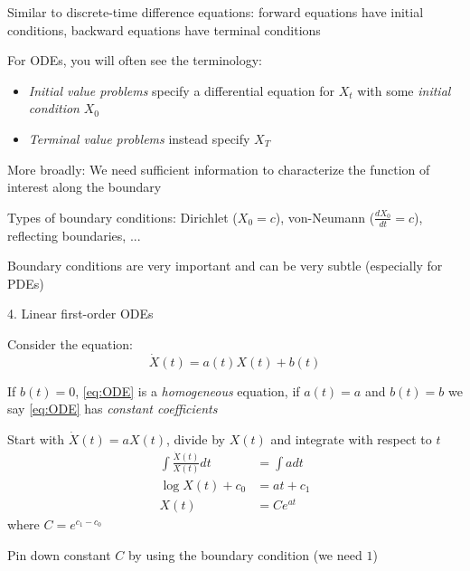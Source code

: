 \documentclass[11pt, aspectratio=169]{beamer}
\newenvironment{witemize}{\itemize\addtolength{\itemsep}{10pt}}{\enditemize}
\begin{document}
\begin{frame}{}
\begin{witemize}
\item Similar to discrete-time difference equations: forward equations have initial conditions, backward equations have terminal conditions

\item For ODEs, you will often see the terminology:
\begin{itemize}
	\item \textit{Initial value problems} specify a differential equation for $X_t$ with some \textit{initial condition} $X_0$
	
	\item \textit{Terminal value problems} instead specify $X_T$
\end{itemize}

\item More broadly: We need sufficient information to characterize the function of interest along the boundary

\item Types of boundary conditions: Dirichlet ($X_0 = c$), von-Neumann ($\frac{dX_0}{dt} = c$), reflecting boundaries, ...

\item Boundary conditions are very important and can be very subtle (especially for PDEs)
\end{witemize}
\end{frame}


\begin{frame}{4. Linear first-order ODEs}
\begin{witemize}
\item Consider the equation:
\begin{equation}\label{eq:ODE}
	\dot X(t) = a(t) X(t) + b(t)
\end{equation}

\item If $b(t) = 0$, \eqref{eq:ODE} is a \textit{homogeneous} equation, if $a(t) = a$ and $b(t) = b$ we say \eqref{eq:ODE} has \textit{constant coefficients}

\item Start with $\dot X(t) = a X(t)$, divide by $X(t)$ and integrate with respect to $t$
\begin{align*}
	\int \frac{\dot X(t)}{X(t)} dt &= \int a dt \\
	\log X(t) + c_0 &= a t + c_1 \\
	X(t) &= C e^{a t}
\end{align*}
where $C = e^{c_1 - c_0}$

\item Pin down constant $C$ by using the boundary condition (we need $1$)
\end{witemize}
\end{frame}
\end{document}
